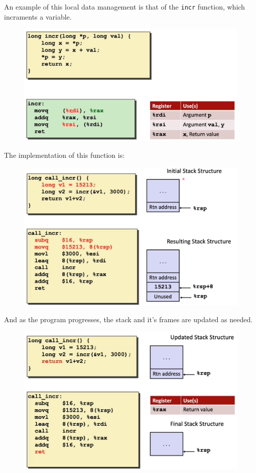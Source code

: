 \documentclass[12pt]{book}
\begin{document}
An example of this local data management is that of the \texttt{incr} function, which incraments a variable.
\begin{figure}[h]
        \centering
        \includegraphics[scale = 0.2]{./figures/localdataEx}
        
\end{figure}

The implementation of this function is:
\begin{figure}[h]
        \centering
        \includegraphics[scale = 0.2]{./figures/localdataEx2}
\end{figure}

And as the program progresses, the stack and it's frames are updated as needed.

\begin{figure}[h]
        \centering
        \includegraphics[scale = 0.17]{./figures/localdataEx3}        
\end{figure}
\end{document}
